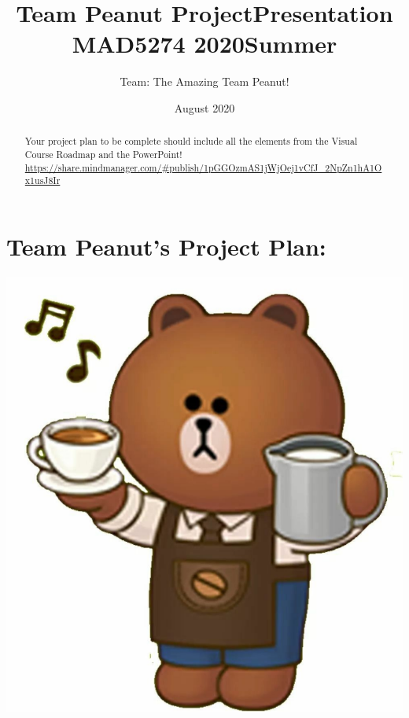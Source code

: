 \documentclass{article}
\title{Team Peanut ProjectPresentation MAD5274 2020Summer}
\author{Team: The Amazing Team Peanut! }
\date{August 2020}
\begin{document}
\maketitle

\section{Team Peanut's Project Plan:}
\includegraphics{brownBearCoffee.png}
\begin{abstract}
    Your project plan to be complete should include all the elements from the Visual Course Roadmap and the PowerPoint!
    \url{https://share.mindmanager.com/#publish/1pGGOzmAS1jWjOej1vCfJ_2NpZn1hA1Ox1usJ8Ir}
\end{abstract}



  
  






\end{document}
